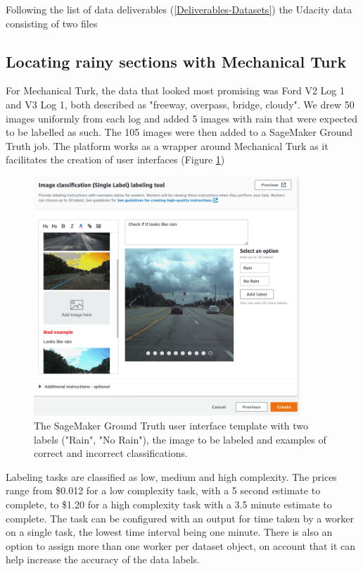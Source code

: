 Following the list of data deliverables (\ref{Deliverables-Datasets}) the Udacity data consisting of two files 

\subsection{Locating rainy sections with Mechanical Turk}
For Mechanical Turk, the data that looked most promising was Ford V2 Log 1 and V3 Log 1, both described as "freeway, overpass, bridge, cloudy". We drew 50 images uniformly from each log and added 5 images with rain that were expected to be labelled as such. The 105 images were then added to a SageMaker Ground Truth job. The platform works as a wrapper around Mechanical Turk as it facilitates the creation of user interfaces (Figure \ref{fig:MechTurkCreateJob})
\begin{figure}[h!]
\centering
\includegraphics[width=10cm]{Figures/MechTurkCreateJob.png}
\caption{The SageMaker Ground Truth user interface template with two labels ("Rain", "No Rain"), the image to be labeled and examples of correct and incorrect classifications.}
\label{fig:MechTurkCreateJob}
\end{figure}
Labeling tasks are classified as low, medium and high complexity. The prices range from \$0.012 for a low complexity task, with a 5 second estimate to complete, to \$1.20 for a high complexity task with a 3.5 minute estimate to complete.
The task can be configured with an output for time taken by a worker on a single task, the lowest time interval being one minute.
There is also an option to assign more than one worker per dataset object, on account that it can help increase the accuracy of the data labels.
